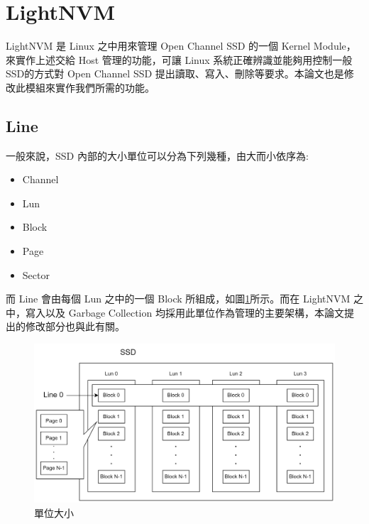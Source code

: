 \section{LightNVM}\label{s2.4}
\indent
LightNVM 是 Linux 之中用來管理 Open Channel SSD 的一個 Kernel Module，來實作上述交給 Host 管理的功能，可讓 Linux 系統正確辨識並能夠用控制一般SSD的方式對 Open Channel SSD 提出讀取、寫入、刪除等要求。本論文也是修改此模組來實作我們所需的功能。

\subsection{Line}\label{s2.4.1}
\indent
一般來說，SSD 內部的大小單位可以分為下列幾種，由大而小依序為:
\begin{itemize}
    \item Channel
    \item Lun
    \item Block
    \item Page
    \item Sector
\end{itemize}
而 Line 會由每個 Lun 之中的一個 Block 所組成，如圖\ref{f2.9}所示。而在 LightNVM 之中，寫入以及 Garbage Collection 均採用此單位作為管理的主要架構，本論文提出的修改部分也與此有關。
\begin{figure}[H]
    \centering
    \includegraphics[width=1\textwidth]{picture/ch2/Line.png}
    \caption{單位大小}
    \label{f2.9}
\end{figure}